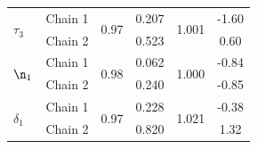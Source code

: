 \begin{table}[H]
\begin{tabular}{lccccc}
\multirow{2}{*}{$\tau_3$} & Chain 1 & \multirow{2}{*}{0.97} & 0.207 & \multirow{2}{*}{1.001} & -1.60 \\
 & Chain 2 & & 0.523 & & 0.60 \\
\midrule
\multirow{2}{*}{$\n_1$} & Chain 1 & \multirow{2}{*}{0.98} & 0.062 & \multirow{2}{*}{1.000} & -0.84 \\
 & Chain 2 & & 0.240 & & -0.85 \\
\midrule
\multirow{2}{*}{$\delta_1$} & Chain 1 & \multirow{2}{*}{0.97} & 0.228 & \multirow{2}{*}{1.021} & -0.38 \\
 & Chain 2 & & 0.820 & & 1.32 \\
\bottomrule
\end{tabular}
\end{table}
